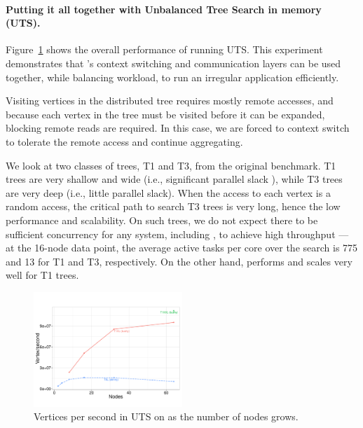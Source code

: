 
\paragraph{Putting it all together with Unbalanced Tree Search in memory
(UTS).} 
Figure~\ref{fig:grappa-uts} shows the overall performance of \Grappa running
UTS. This experiment demonstrates that \Grappa's context
switching and communication layers can be used together, while
balancing workload, to run an irregular application efficiently. 

Visiting vertices in the distributed tree requires mostly remote
accesses, and because each vertex in the tree must be visited before
it can be expanded, blocking remote reads are required. In this case,
we are forced to context switch to tolerate the remote access and
continue aggregating.

We look at two classes of trees, T1 and T3, from
the original benchmark. T1 trees are very shallow and wide (i.e., significant
parallel slack ), while T3 trees are very deep (i.e., little parallel slack).
When the access to each vertex is a random access, the critical path to search
T3 trees is very long, hence the low performance and scalability. On such
trees, we do not expect there to be sufficient concurrency for any system,
including \Grappa, to achieve high throughput --- at the 16-node data point,
the average active tasks per core over the search is 775 and 13 for T1 and T3,
respectively. On the other hand, \Grappa performs and scales very well for T1
trees.


\begin{figure}[ht]
    \begin{center}
      \includegraphics[width=0.5\textwidth]{figs/uts_scale.pdf}
    \end{center}
    \caption{Vertices per second in UTS on \Grappa as the number of nodes grows.}
    \label{fig:grappa-uts}
\end{figure}

